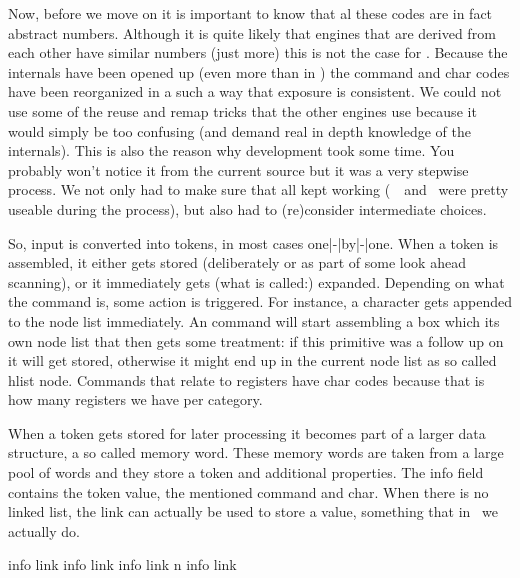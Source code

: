 Now, before we move on it is important to know that al these codes are in fact
abstract numbers. Although it is quite likely that engines that are derived from
each other have similar numbers (just more) this is not the case for \LUAMETATEX.
Because the internals have been opened up (even more than in \LUATEX) the command
and char codes have been reorganized in a such a way that exposure is consistent.
We could not use some of the reuse and remap tricks that the other engines use
because it would simply be too confusing (and demand real in depth knowledge of
the internals). This is also the reason why development took some time. You
probably won't notice it from the current source but it was a very stepwise
process. We not only had to make sure that all kept working (\CONTEXT\ \LMTX\ and
\LUAMETATEX\ were pretty useable during the process), but also had to
(re)consider intermediate choices.

So, input is converted into tokens, in most cases one|-|by|-|one. When a token is
assembled, it either gets stored (deliberately or as part of some look ahead
scanning), or it immediately gets (what is called:) expanded. Depending on what
the command is, some action is triggered. For instance, a character gets appended
to the node list immediately. An \type {\hbox} command will start assembling a
box which its own node list that then gets some treatment: if this primitive was a
follow up on \type {\setbox} it will get stored, otherwise it might end up in the
current node list as so called hlist node. Commands that relate to registers have
 char codes because that is how many registers we have per category.

When a token gets stored for later processing it becomes part of a larger data
structure, a so called memory word. These memory words are taken from a large
pool of words and they store a token and additional properties. The info field
contains the token value, the mentioned command and char. When there is no linked
list, the link can actually be used to store a value, something that in
\LUAMETATEX\ we actually do.

\startlinecorrection[blank]
    \setupTABLE[each][align=middle]
    \setupTABLE[c][1][width=8mm]
    \setupTABLE[c][2][width=64mm]
    \setupTABLE[c][3][width=64mm]
    \bTABLE
        \bTR {} \eTD \bTD info \eTD \bTD link \eTD \eTR
        \bTR {} \eTD \bTD info \eTD \bTD link \eTD \eTR
        \bTR {} \eTD \bTD info \eTD \bTD link \eTD \eTR
        \bTR \bTD n \eTD \bTD info \eTD \bTD link \eTD \eTR
    \eTABLE
\stoplinecorrection

